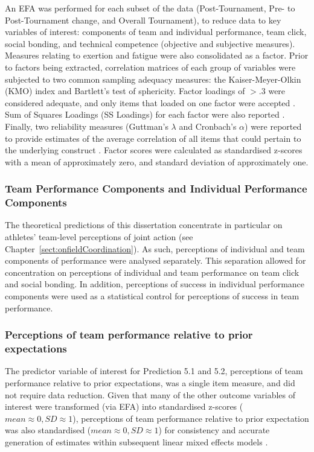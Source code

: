 \begin{CJK}{UTF8}{gbsn}
An EFA was performed for each subset of the data (Post-Tournament, Pre- to Post-Tournament change, and Overall Tournament), to reduce data to key variables of interest: components of team and individual performance, team click, social bonding, and technical competence (objective and subjective measures).  Measures relating to exertion and fatigue were also consolidated as a factor.  Prior to factors being extracted, correlation matrices of each group of variables were subjected to two common sampling adequacy measures: the Kaiser-Meyer-Olkin (KMO) index and Bartlett's test of sphericity.  Factor loadings of $> .3$ were considered adequate, and only items that loaded on one factor were accepted \citep{Field2012}.  Sum of Squares Loadings (SS Loadings) for each factor were also reported \citep{Dziuban1974}.  Finally, two reliability measures (Guttman's $\lambda$ and Cronbach's $\alpha$) were reported to provide estimates of the average correlation of all items that could pertain to the underlying construct \citep[values  $> .5$ were considered acceptable; see][]{Benton2015,Tabachnick2007}.  Factor scores were calculated as standardised z-scores with a mean of approximately zero, and standard deviation of approximately one.

\subsubsection{Team Performance Components and Individual Performance Components}
The theoretical predictions of this dissertation concentrate in particular on athletes' team-level perceptions of joint action (see Chapter~\ref{sect:onfieldCoordination}).  As such, perceptions of individual and team components of performance were analysed separately.  This separation allowed for concentration on perceptions of individual and team performance on team click and social bonding. In addition, perceptions of success in individual performance components were used as a statistical control for perceptions of success in team performance.


\subsubsection{Perceptions of team performance relative to prior expectations}
The predictor variable of interest for Prediction 5.1 and 5.2, perceptions of team performance relative to prior expectations, was a single item measure, and did not require data reduction.  Given that many of the other outcome variables of interest were transformed (via EFA) into standardised z-scores ($mean \approx 0, SD \approx 1$), perceptions of team performance relative to prior expectation was also standardised ($mean \approx 0, SD \approx 1$) for consistency and accurate generation of estimates within subsequent linear mixed effects models \citep{Bates2015}.


\end{CJK}
